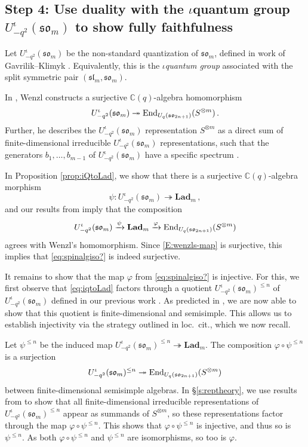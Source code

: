 \documentclass[10pt]{amsart}
\numberwithin{equation}{section}
\theoremstyle{definition}
\newcommand{\End}{{\rm End}}
\def\C{{\mathbb C}}
\newcommand{\slm}{\mathfrak{sl}_{m}}
\newcommand{\son}[1][2n+1]{\mathfrak{so}_{#1}}
\newcommand{\som}[1][m]{\mathfrak{so}_{#1}}
\newcommand{\iqUsom}[1][m]{{U}^{\iota}_{-q^2}(\som[#1])}
\newcommand{\Lad}{\mathbf{Lad}}
\begin{document}
\subsection{Step 4: Use duality with the $\iota$quantum group $\iqUsom$
	to show fully faithfulness}

Let $\iqUsom$ be the non-standard quantization of $\som$, 
defined in work of Gavrilik--Klimyk \cite{GK-Usom}.
Equivalently, this is the $\iota$\emph{quantum group} associated with 
the split symmetric pair $(\slm, \som)$. 

In \cite[Theorem 5.2]{Wenzl-Spin}, 
Wenzl constructs a surjective $\C(q)$-algebra homomorphism
\begin{equation}\label{E:wenzls-map}
\iqUsom \twoheadrightarrow \End_{U_q(\son)}(S^{\otimes m}) \, .
\end{equation}
Further, he describes the $\iqUsom$ representation $S^{\otimes m}$ as a direct sum of finite-dimensional irreducible $\iqUsom$ representations, 
such that the generators $b_1, \dots, b_{m-1}$ of $\iqUsom$ have a specific spectrum \cite[Theorem 5.3(a)]{Wenzl-Spin}.

In Proposition \ref{prop:iQtoLad}, we show that there is a surjective $\C(q)$-algebra morphism
\begin{equation}
	\label{eq:iqtoLad}
\psi \colon \iqUsom \twoheadrightarrow \Lad_m \, ,
\end{equation}
and our results from \cite{BER} imply that the composition
\begin{equation}
	\label{eq:iqtoSpin}
\iqUsom \xrightarrow{\psi} \Lad_m \xrightarrow{\varphi} \End_{U_q(\son)}(S^{\otimes m})
\end{equation}
agrees with Wenzl's homomorphism. 
Since \eqref{E:wenzls-map} is surjective, 
this implies that \eqref{eq:spinalgiso?} is indeed surjective.

It remains to show that the map $\varphi$ from \eqref{eq:spinalgiso?} is injective. 
For this, we first observe that \eqref{eq:iqtoLad} 
factors through a quotient $\iqUsom^{\leq n}$ of $\iqUsom$
defined in our previous work \cite{BER}.
As predicted in \cite[Remark 1.21]{BER}, 
we are now able to show that this quotient is finite-dimensional and semisimple.
This allows us to establish injectivity via the strategy outlined in loc.~cit., 
which we now recall.

Let $\psi^{\le n}$ be the induced map $\iqUsom^{\leq n} \twoheadrightarrow \Lad_m$. 
The composition $\varphi \circ \psi^{\le n}$ is a surjection 
\begin{equation}
	\label{eq:iqtoSpin2}
\iqUsom^{\leq n} \twoheadrightarrow \End_{U_q(\son)}(S^{\otimes m})
\end{equation}
between finite-dimensional semisimple algebras.  
In \S \ref{s:reptheory}, we use results from \cite{MR2143754} to show that
all finite-dimensional irreducible representations of $\iqUsom^{\leq n}$ 
appear as summands of $S^{\otimes m}$, so these representations factor through the map $\varphi \circ \psi^{\le n}$. 
This shows that $\varphi \circ \psi^{\le n}$ is injective, and thus so is $\psi^{\le n}$. 
As both $\varphi \circ \psi^{\le n}$ and $\psi^{\le n}$ are isomorphisms, so too is $\varphi$.
\end{document}
